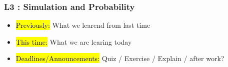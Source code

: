 
\begin{frame}
    \frametitle{L3 : Simulation and Probability}
    \begin{itemize}
        \item \hl{Previously: } What we learend from last time
        \item \hl{This time: } What we are learing today
        \item \hl{Deadlines/Announcements: } Quiz / Exercise / Explain / after work?
    \end{itemize}
    
    \end{frame}
    
